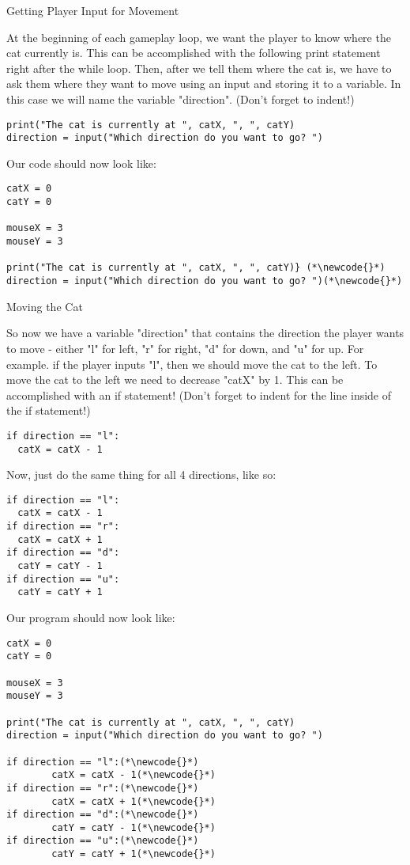 \documentclass[12pt,oneside]{article}
\newcommand{\subsectitle}[1]{
  \begin{flushleft}{\large#1}\end{flushleft}
}
\newcommand{\newcode}[0]{\hfill<--}
\begin{document}
\begin{samepage}
\subsectitle{Getting Player Input for Movement}

At the beginning of each gameplay loop, we want the player to know where the cat currently is. This can be accomplished with the following print statement right after the while loop. Then, after we tell them where the cat is, we have to ask them where they want to move using an input and storing it to a variable. In this case we will name the variable "direction".  (Don't forget to indent!)

\begin{lstlisting}
print("The cat is currently at ", catX, ", ", catY)
direction = input("Which direction do you want to go? ")
\end{lstlisting}

Our code should now look like:

\begin{lstlisting}
catX = 0
catY = 0

mouseX = 3
mouseY = 3

print("The cat is currently at ", catX, ", ", catY)} (*\newcode{}*)
direction = input("Which direction do you want to go? ")(*\newcode{}*)
\end{lstlisting}
\end{samepage}

\begin{samepage}
\subsectitle{Moving the Cat}
So now we have a variable "direction" that contains the direction the player wants to move - either "l" for left, "r" for right, "d" for down, and "u" for up. For example. if the player inputs "l", then we should move the cat to the left. To move the cat to the left we need to decrease "catX" by 1. This can be accomplished with an if statement! (Don't forget to indent for the line inside of the if statement!)

\begin{lstlisting}
if direction == "l":
  catX = catX - 1
\end{lstlisting}

Now, just do the same thing for all 4 directions, like so:

\begin{lstlisting}
if direction == "l":
  catX = catX - 1
if direction == "r":
  catX = catX + 1
if direction == "d":
  catY = catY - 1
if direction == "u":
  catY = catY + 1
\end{lstlisting}

Our program should now look like:

\begin{lstlisting}
catX = 0
catY = 0

mouseX = 3
mouseY = 3

print("The cat is currently at ", catX, ", ", catY)
direction = input("Which direction do you want to go? ")

if direction == "l":(*\newcode{}*)
        catX = catX - 1(*\newcode{}*)
if direction == "r":(*\newcode{}*)
        catX = catX + 1(*\newcode{}*)
if direction == "d":(*\newcode{}*)
        catY = catY - 1(*\newcode{}*)
if direction == "u":(*\newcode{}*)
        catY = catY + 1(*\newcode{}*)
\end{lstlisting}
\end{samepage}
\end{document}
